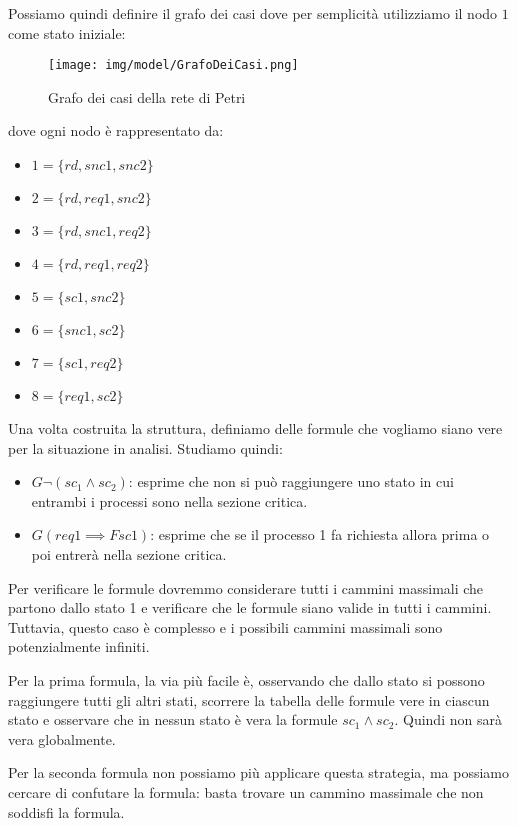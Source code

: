 \begin{esempio}
    Possiamo quindi definire il grafo dei casi dove per semplicità utilizziamo il
    nodo $1$ come stato iniziale:
    \begin{figure}[!ht]
        \centering
        \texttt{[image: img/model/GrafoDeiCasi.png]}
        \caption{Grafo dei casi della rete di Petri}
    \end{figure}
    dove ogni nodo è rappresentato da:
    \begin{itemize}
        \item $1=\{rd,snc1,snc2\}$
        \item $2=\{rd,req1,snc2\}$
        \item $3=\{rd,snc1,req2\}$
        \item $4=\{rd,req1,req2\}$
        \item $5=\{sc1, snc2\}$
        \item $6=\{snc1,sc2\}$
        \item $7=\{sc1, req 2\}$
        \item $8=\{req1,sc2\}$
    \end{itemize}
    Una volta costruita la struttura, definiamo delle formule che vogliamo siano
    vere per la situazione in analisi. Studiamo quindi:
    \begin{itemize}
        \item $G \lnot (sc_1\land sc_2)$: esprime che non si può raggiungere
              uno stato in cui entrambi i processi sono nella sezione critica.
        \item $G (req1 \implies F sc1)$: esprime che se il processo 1 fa richiesta
              allora prima o poi entrerà nella sezione critica.
    \end{itemize}
    Per verificare le formule dovremmo considerare tutti i cammini massimali che
    partono dallo stato 1 e verificare che le formule siano valide in tutti i
    cammini. Tuttavia, questo caso è complesso e i possibili cammini massimali
    sono potenzialmente infiniti.

    Per la prima formula, la via più facile è, osservando che dallo stato si
    possono raggiungere tutti gli altri stati, scorrere la tabella delle formule
    vere in ciascun stato e osservare che in nessun stato è vera la formule
    $sc_1 \land sc_2$. Quindi non sarà vera globalmente.

    Per la seconda formula non possiamo più applicare questa strategia, ma
    possiamo cercare di confutare la formula: basta trovare un cammino massimale
    che non soddisfi la formula.


\end{esempio}

